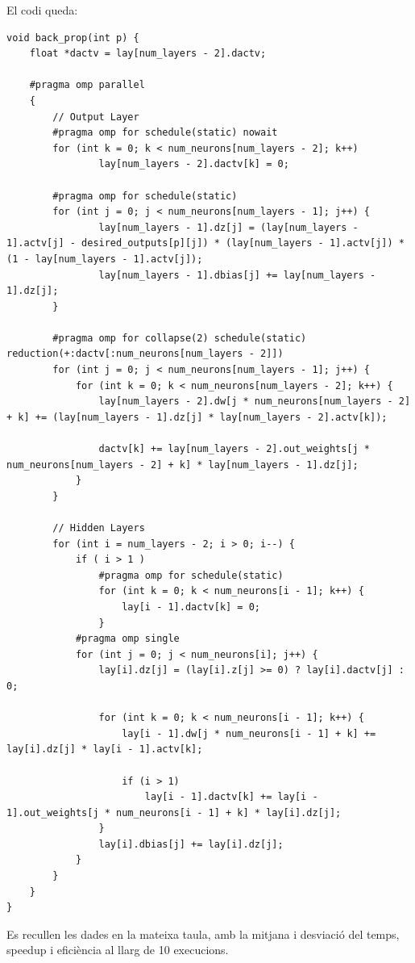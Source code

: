 \documentclass{article}
\begin{document}
El codi queda:
\begin{lstlisting}
void back_prop(int p) {
    float *dactv = lay[num_layers - 2].dactv;

    #pragma omp parallel
    {
        // Output Layer
        #pragma omp for schedule(static) nowait
        for (int k = 0; k < num_neurons[num_layers - 2]; k++)
                lay[num_layers - 2].dactv[k] = 0;

        #pragma omp for schedule(static)
        for (int j = 0; j < num_neurons[num_layers - 1]; j++) {
                lay[num_layers - 1].dz[j] = (lay[num_layers - 1].actv[j] - desired_outputs[p][j]) * (lay[num_layers - 1].actv[j]) * (1 - lay[num_layers - 1].actv[j]);
                lay[num_layers - 1].dbias[j] += lay[num_layers - 1].dz[j];
        }

        #pragma omp for collapse(2) schedule(static) reduction(+:dactv[:num_neurons[num_layers - 2]])
        for (int j = 0; j < num_neurons[num_layers - 1]; j++) {
            for (int k = 0; k < num_neurons[num_layers - 2]; k++) {
                lay[num_layers - 2].dw[j * num_neurons[num_layers - 2] + k] += (lay[num_layers - 1].dz[j] * lay[num_layers - 2].actv[k]);
                
                dactv[k] += lay[num_layers - 2].out_weights[j * num_neurons[num_layers - 2] + k] * lay[num_layers - 1].dz[j];
            }
        }

        // Hidden Layers
        for (int i = num_layers - 2; i > 0; i--) {
            if ( i > 1 )
                #pragma omp for schedule(static)
                for (int k = 0; k < num_neurons[i - 1]; k++) {
                    lay[i - 1].dactv[k] = 0;
                }
            #pragma omp single
            for (int j = 0; j < num_neurons[i]; j++) {
                lay[i].dz[j] = (lay[i].z[j] >= 0) ? lay[i].dactv[j] : 0;

                for (int k = 0; k < num_neurons[i - 1]; k++) {
                    lay[i - 1].dw[j * num_neurons[i - 1] + k] += lay[i].dz[j] * lay[i - 1].actv[k];

                    if (i > 1)
                        lay[i - 1].dactv[k] += lay[i - 1].out_weights[j * num_neurons[i - 1] + k] * lay[i].dz[j];
                }
                lay[i].dbias[j] += lay[i].dz[j];
            }
        }
    }
}
\end{lstlisting}

Es recullen les dades en la mateixa taula, amb la mitjana i desviació del temps, speedup i eficiència al llarg de 10 execucions.
\end{document}

